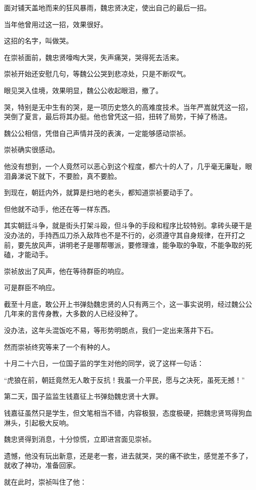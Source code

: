 \begin{multicols}{\theparacolNo}
面对铺天盖地而来的狂风暴雨，魏忠贤决定，使出自己的最后一招。

当年他曾用过这一招，效果很好。

这招的名字，叫做哭。

在崇祯面前，魏忠贤嚎啕大哭，失声痛哭，哭得死去活来。

崇祯开始还安慰几句，等魏公公哭到悲凉处，只是不断叹气。

眼见哭入佳境，效果明显，魏公公收起眼泪，撤了。

哭，特别是无中生有的哭，是一项历史悠久的高难度技术。当年严嵩就凭这一招，哭倒了夏言，最后将其办挺。他也曾凭这一招，扭转了局势，干掉了杨涟。

魏公公相信，凭借自己声情并茂的表演，一定能够感动崇祯。

崇祯确实很感动。

他没有想到，一个人竟然可以恶心到这个程度，都六十的人了，几乎毫无廉耻，眼泪鼻涕说下就下，不要脸，真不要脸。

到现在，朝廷内外，就算是扫地的老头，都知道崇祯要动手了。

但他就不动手，他还在等一样东西。

其实朝廷斗争，就是街头打架斗殴，但斗争的手段和程序比较特别。拿砖头硬干是没办法的，手持西瓜刀杀入敌阵也不是不行的，必须遵守其自身规律，在开打之前，要先放风声，讲明老子是哪帮哪派，要修理谁，能争取的争取，不能争取的死磕，才能动手。

崇祯放出了风声，他在等待群臣的响应。

可是群臣不响应。

截至十月底，敢公开上书弹劾魏忠贤的人只有两三个，这一事实说明，经过魏公公几年来的言传身教，大多数的人已经没种了。

没办法，这年头混饭吃不易，等形势明朗点，我们一定出来落井下石。

然而崇祯终究等来了一个有种的人。

十月二十六日，一位国子监的学生对他的同学，说了这样一句话：

“虎狼在前，朝廷竟然无人敢于反抗！我虽一介平民，愿与之决死，虽死无撼！”

第二天，国子监监生钱嘉征上书弹劾魏忠贤十大罪。

钱嘉征虽然只是学生，但文笔相当不错，内容极狠，态度极硬，把魏忠贤骂得狗血淋头，引起极大反响。

魏忠贤得到消息，十分惊慌，立即进宫面见崇祯。

遗憾，他没有玩出新意，还是老一套，进去就哭，哭的痛不欲生，感觉差不多了，就收了神功，准备回家。

就在此时，崇祯叫住了他：


\end{multicols}
